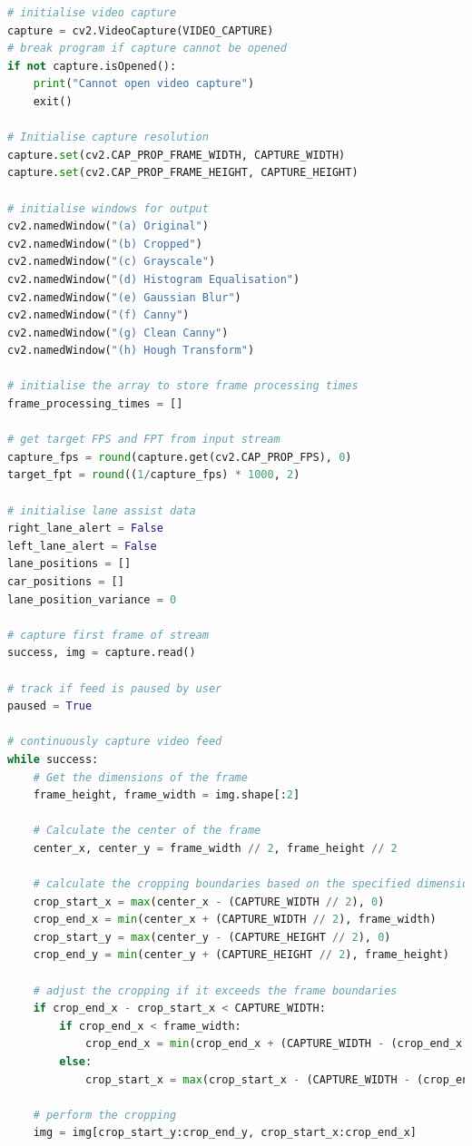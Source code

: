 \documentclass[10pt,conference]{IEEEtran}
\begin{document}
\begin{lstlisting}[language=Python,basicstyle=\tiny, showspaces=false, showstringspaces=false tabsize=1, breaklines=true]
# initialise video capture
capture = cv2.VideoCapture(VIDEO_CAPTURE)
# break program if capture cannot be opened
if not capture.isOpened():
    print("Cannot open video capture")
    exit()

# Initialise capture resolution
capture.set(cv2.CAP_PROP_FRAME_WIDTH, CAPTURE_WIDTH)
capture.set(cv2.CAP_PROP_FRAME_HEIGHT, CAPTURE_HEIGHT)

# initialise windows for output
cv2.namedWindow("(a) Original")
cv2.namedWindow("(b) Cropped")
cv2.namedWindow("(c) Grayscale")
cv2.namedWindow("(d) Histogram Equalisation")
cv2.namedWindow("(e) Gaussian Blur")
cv2.namedWindow("(f) Canny")
cv2.namedWindow("(g) Clean Canny")
cv2.namedWindow("(h) Hough Transform")

# initialise the array to store frame processing times
frame_processing_times = []

# get target FPS and FPT from input stream
capture_fps = round(capture.get(cv2.CAP_PROP_FPS), 0)
target_fpt = round((1/capture_fps) * 1000, 2)

# initialise lane assist data
right_lane_alert = False
left_lane_alert = False
lane_positions = []
car_positions = []
lane_position_variance = 0

# capture first frame of stream
success, img = capture.read()

# track if feed is paused by user
paused = True

# continuously capture video feed
while success:
    # Get the dimensions of the frame
    frame_height, frame_width = img.shape[:2]

    # Calculate the center of the frame
    center_x, center_y = frame_width // 2, frame_height // 2

    # calculate the cropping boundaries based on the specified dimensions
    crop_start_x = max(center_x - (CAPTURE_WIDTH // 2), 0)
    crop_end_x = min(center_x + (CAPTURE_WIDTH // 2), frame_width)
    crop_start_y = max(center_y - (CAPTURE_HEIGHT // 2), 0)
    crop_end_y = min(center_y + (CAPTURE_HEIGHT // 2), frame_height)

    # adjust the cropping if it exceeds the frame boundaries
    if crop_end_x - crop_start_x < CAPTURE_WIDTH:
        if crop_end_x < frame_width:
            crop_end_x = min(crop_end_x + (CAPTURE_WIDTH - (crop_end_x - crop_start_x)), frame_width)
        else:
            crop_start_x = max(crop_start_x - (CAPTURE_WIDTH - (crop_end_x - crop_start_x)), 0)

    # perform the cropping
    img = img[crop_start_y:crop_end_y, crop_start_x:crop_end_x]


\end{lstlisting}
\end{document}
